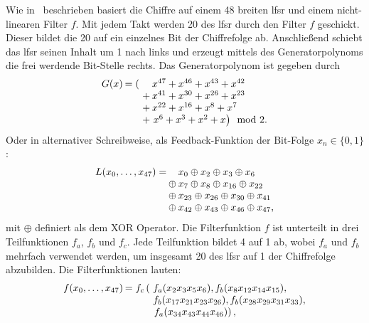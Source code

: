 Wie in~\cite{Verdult2015} beschrieben basiert die Chiffre auf einem \SI{48}{\bit} breiten \gls{lfsr} und einem nicht-linearen Filter \(f\). Mit jedem Takt werden \SI{20}{\bit} des \gls{lfsr} durch den Filter \(f\) geschickt. Dieser bildet die \SI{20}{\bit} auf ein einzelnes Bit der Chiffrefolge ab. Anschließend schiebt das \gls{lfsr} seinen Inhalt um \SI{1}{\bit} nach links und erzeugt mittels des Generatorpolynoms die frei werdende Bit-Stelle rechts. Das Generatorpolynom ist gegeben durch
%
\begin{equation*}
    \setlength\arraycolsep{1pt}
    \begin{array}{c r r l}
        G(x) & = \left( \right. &   & x^{47} + x^{46} + x^{43} + x^{42}                      \\  %
             &                  & + & x^{41} + x^{30} + x^{26} + x^{23}                      \\
             &                  & + & x^{22} + x^{16} + x^{8} + x^{7}                        \\
             &                  & + & {\left. x^{6} + x^{3} + x^{2} + x \right)} \mod{2} {.} %
    \end{array}
\end{equation*}
%
Oder in alternativer Schreibweise, als Feedback-Funktion der Bit-Folge \(x_{n} \in {\{0, 1\}}\):
%
\begin{equation*}
    \setlength\arraycolsep{1pt}
    \begin{array}{r r l}
        L(x_{0}, \dots, x_{47}) = &        & x_{0} \oplus x_{2} \oplus x_{3} \oplus x_{6}         \\
                                  & \oplus & x_{7} \oplus x_{8} \oplus x_{16} \oplus x_{22}       \\
                                  & \oplus & x_{23} \oplus x_{26} \oplus x_{30} \oplus x_{41}     \\
                                  & \oplus & x_{42} \oplus x_{43} \oplus x_{46} \oplus x_{47} {,}
    \end{array}
\end{equation*}
%
mit \(\oplus \) definiert als dem \foreignlanguage{english}{XOR} Operator. Die Filterfunktion \(f\) ist unterteilt in drei Teilfunktionen \(f_{a}\), \(f_{b}\) und \(f_{c}\). Jede Teilfunktion bildet \SI{4}{\bit} auf \SI{1}{\bit} ab, wobei \(f_{a}\) und \(f_{b}\) mehrfach verwendet werden, um insgesamt \SI{20}{\bit} des \gls{lfsr} auf \SI{1}{\bit} der Chiffrefolge abzubilden. Die Filterfunktionen lauten:
%
\begin{equation*}
    \setlength\arraycolsep{1pt}
    \begin{array}{c r l}
        f(x_{0}, \dots, x_{47}) & =  f_{c} \left( \right. & f_{a}(x_{2} x_{3} x_{5} x_{6}), f_{b}(x_{8} x_{12} x_{14} x_{15}),      \\ %
                                &                         & f_{b}(x_{17} x_{21} x_{23} x_{26}), f_{b}(x_{28} x_{29} x_{31} x_{33}), \\
                                &                         & \left. f_{a}(x_{34} x_{43} x_{44} x_{46}) \right) {,}
    \end{array}
\end{equation*}
